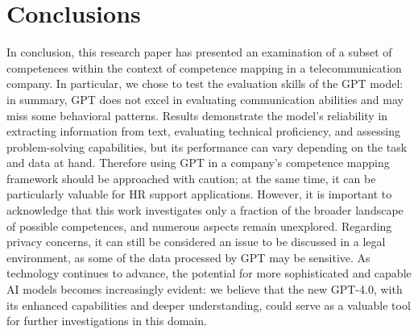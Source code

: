 \chapter{Conclusions}


In conclusion, this research paper has presented an examination of a subset of competences within the context of competence mapping in a telecommunication company.
In particular, we chose to test the evaluation skills of the GPT model: in summary, GPT does not excel in evaluating communication abilities and may miss some behavioral patterns. Results demonstrate the model's reliability in extracting information from text, evaluating technical proficiency, and assessing problem-solving capabilities, but its performance can vary depending on the task and data at hand. Therefore using GPT in a company's competence mapping framework should be approached with caution; at the same time, it can be particularly valuable for HR support applications. However, it is important to acknowledge that this work investigates only a fraction of the broader landscape of possible competences, and numerous aspects remain unexplored. Regarding privacy concerns, it can still be considered an issue to be discussed in a legal environment, as some of the data processed by GPT may be sensitive. As technology continues to advance, the potential for more sophisticated and capable AI models becomes increasingly evident: we believe that the new GPT-4.0, with its enhanced capabilities and deeper understanding, could serve as a valuable tool for further investigations in this domain.




